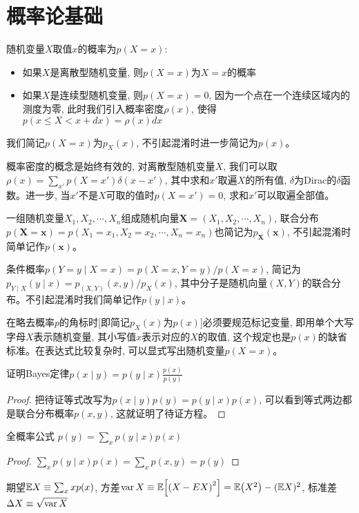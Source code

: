 \chapter{概率论基础}
\par 随机变量$X$取值$x$的概率为$p(X=x)$:
\begin{itemize}
    \item 如果$X$是离散型随机变量, 则$p(X=x)$为$X=x$的概率
    \item 如果$X$是连续型随机变量, 则$p(X=x)=0$, 因为一个点在一个连续区域内的测度为零, 此时我们引入概率密度$\rho(x)$, 使得$p(x\leq X<x+dx)=\rho(x)dx$
\end{itemize}
我们简记$p(X=x)$为$p_X(x)$, 不引起混淆时进一步简记为$p(x)$。
\par 概率密度的概念是始终有效的, 对离散型随机变量$X$, 我们可以取$\rho(x)=\sum_{x'}p(X=x')\delta(x-x')$, 其中求和$x'$取遍$X$的所有值, $\delta$为Dirac的$\delta$函数。进一步, 当$x'$不是$X$可取的值时$p(X=x')=0$, 求和$x'$可以取遍全部值。
\par 一组随机变量$X_1,X_2,\cdots,X_n$组成随机向量$\bm X=(X_1,X_2,\cdots,X_n)$, 联合分布$p(\bm X=\bm x)=p(X_1=x_1,X_2=x_2,\cdots,X_n=x_n)$也简记为$p_{\bm X}(\bm x)$, 不引起混淆时简单记作$p(\bm x)$。
\par 条件概率$p(Y=y\mid X=x)=p(X=x,Y=y)/p(X=x)$, 简记为$p_{Y\mid X}(y\mid x)=p_{(X,Y)}(x,y)/p_X(x)$, 其中分子是随机向量$(X,Y)$的联合分布。不引起混淆时我们简单记作$p(y\mid x)$。
\par{}\quad 在略去概率$p$的角标时[即简记$p_X(x)$为$p(x)$]必须要规范标记变量, 即用单个大写字母$X$表示随机变量, 其小写值$x$表示对应的$X$的取值, 这个规定也是$p(x)$的缺省标准。在表达式比较复杂时, 可以显式写出随机变量$p(X=x)$。
\begin{exercise}[教材A.1] 证明Bayes定律$p(x\mid y)=p(y\mid x)\frac{p(x)}{p(y)}$
\end{exercise}
\begin{proof}
    把待证等式改写为$p(x\mid y)p(y)=p(y\mid x)p(x)$, 可以看到等式两边都是联合分布概率$p(x,y)$, 这就证明了待证方程。
\end{proof}
\begin{exercise}[教材A.2]
    全概率公式 $p(y)=\sum_x p(y\mid x)p(x)$
\end{exercise}
\begin{proof}
    $\sum_x p(y\mid x)p(x)=\sum_x p(x,y)=p(y)$
\end{proof}
\par 期望$\mathbb{E} X\equiv\sum_x xp(x)$, 方差$\operatorname{{\rm var}} X\equiv\mathbb{E}\qty[\qty(X-EX)^2]=\mathbb{E}\qty(X^2)-(\mathbb{E} X)^2$, 标准差$\Delta X\equiv\sqrt{\operatorname{{\rm var}} X}$
